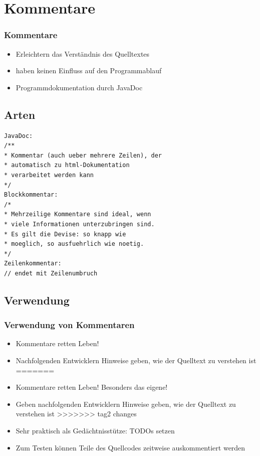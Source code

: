 \documentclass[final]{beamer}
\begin{document}
\section{Kommentare}
\begin{frame}
	\frametitle{Kommentare}
	\begin{itemize}
		\item{Erleichtern das Verständnis des Quelltextes}
		\item{haben keinen Einfluss auf den Programmablauf}
		\item{Programmdokumentation durch JavaDoc}
	\end{itemize}
\end{frame}

\subsection{Arten}
\begin{frame}[containsverbatim]
	\begin{lstlisting}
JavaDoc:
/**
* Kommentar (auch ueber mehrere Zeilen), der
* automatisch zu html-Dokumentation
* verarbeitet werden kann
*/
Blockkommentar:
/*
* Mehrzeilige Kommentare sind ideal, wenn
* viele Informationen unterzubringen sind.
* Es gilt die Devise: so knapp wie
* moeglich, so ausfuehrlich wie noetig.
*/
Zeilenkommentar:
// endet mit Zeilenumbruch
	\end{lstlisting}
\end{frame}

\subsection{Verwendung}
\begin{frame}
	\frametitle{Verwendung von Kommentaren}
	\begin{itemize}
<<<<<<< HEAD
		\item{Kommentare retten Leben!}
		\item{Nachfolgenden Entwicklern Hinweise geben, wie der Quelltext zu verstehen ist}
=======
		\item{Kommentare retten Leben! Besonders das eigene!}
		\item{Geben nachfolgenden Entwicklern Hinweise geben, wie der Quelltext zu verstehen ist}
>>>>>>> tag2 changes
		\item{Sehr praktisch als Gedächtnisstütze: TODOs setzen}
		\item{Zum Testen können Teile des Quellcodes zeitweise auskommentiert werden}
	\end{itemize}
\end{frame}
\end{document}
